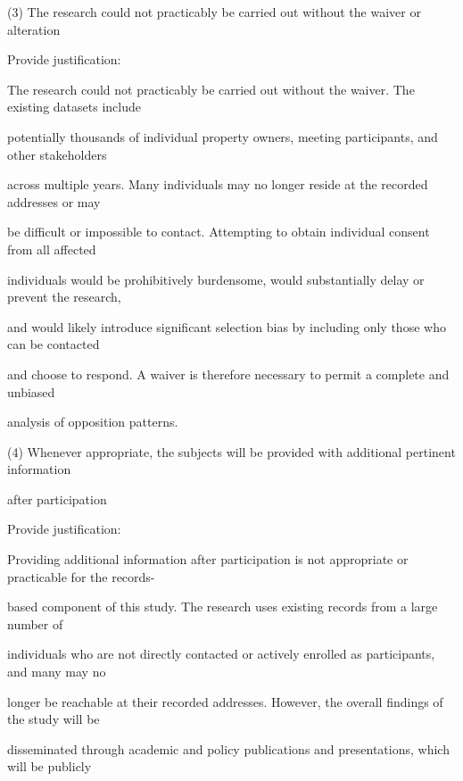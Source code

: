 \documentclass[10pt, letterpaper]{article}
\begin{document}
\begin{responsebox}
\vspace{0.5em}

\vspace{0.5em}

(3) The research could not practicably be carried out without the waiver or alteration

Provide justification:

The research could not practicably be carried out without the waiver. The existing datasets include

potentially thousands of individual property owners, meeting participants, and other stakeholders

across multiple years. Many individuals may no longer reside at the recorded addresses or may

\vspace{0.5em}

be difficult or impossible to contact. Attempting to obtain individual consent from all affected

individuals would be prohibitively burdensome, would substantially delay or prevent the research,

and would likely introduce significant selection bias by including only those who can be contacted

and choose to respond. A waiver is therefore necessary to permit a complete and unbiased

analysis of opposition patterns.

\vspace{0.5em}

\vspace{0.5em}

(4) Whenever appropriate, the subjects will be provided with additional pertinent information

after participation

Provide justification:

Providing additional information after participation is not appropriate or practicable for the records-

based component of this study. The research uses existing records from a large number of

individuals who are not directly contacted or actively enrolled as participants, and many may no

longer be reachable at their recorded addresses. However, the overall findings of the study will be

disseminated through academic and policy publications and presentations, which will be publicly


\end{responsebox}
\end{document}
